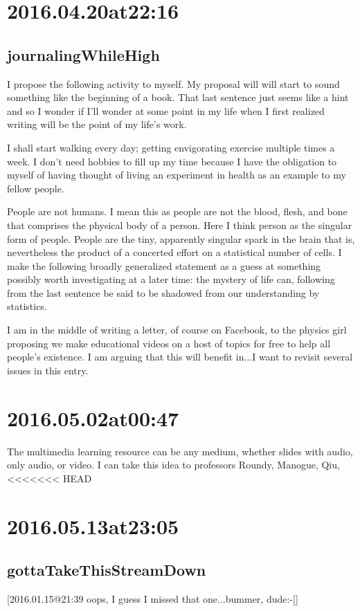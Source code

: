 \section*{ 2016.04.20at22:16 }
\subsection*{journalingWhileHigh}
I propose the following activity to myself. My proposal will will start to sound something like the beginning of a book. That last sentence just seems like a hint and so I wonder if I'll wonder at some point in my life when I first realized writing will be the point of my life's work.

I shall start walking every day; getting envigorating exercise multiple times a week. I don't need hobbies to fill up my time because I have the obligation to myself of having thought of living an experiment in health as an example to my fellow people.

People are not humans. I mean this as people are not the blood, flesh, and bone that comprises the physical body of a person. Here I think person as the singular form of people. People are the tiny, apparently singular spark in the brain that is, nevertheless the product of a concerted effort on a statistical number of cells. I make the following broadly generalized statement as a guess at something possibly worth investigating at a later time: the mystery of life can, following from the last sentence be said to be shadowed from our understanding by statistics.

I am in the middle of writing a letter, of course on Facebook, to the physics girl proposing we make educational videos on a host of topics for free to help all people's existence. I am arguing that this will benefit in...I want to revisit several issues in this entry. 

\section*{ 2016.05.02at00:47 }
The multimedia learning resource can be any medium, whether slides with audio, only audio, or video. I can take this idea to professors Roundy, Manogue, Qiu, 
<<<<<<< HEAD

\section*{ 2016.05.13at23:05 }
\subsection*{ gottaTakeThisStreamDown }
[2016.01.15@21:39 oops, I guess I missed that one...bummer, dude:-[]


